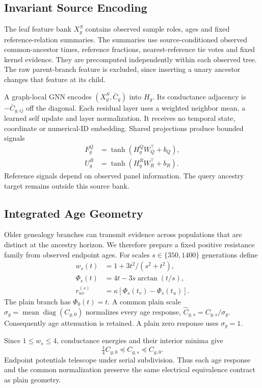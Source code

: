\documentclass[letterpaper]{article}
\begin{document}
\subsection{Invariant Source Encoding}
The leaf feature bank $X_g^S$ contains observed sample roles, ages and fixed reference-relation summaries. The summaries use source-conditioned observed common-ancestor times, reference fractions, nearest-reference tie votes and fixed kernel evidence. They are precomputed independently within each observed tree. The raw parent-branch feature is excluded, since inserting a unary ancestor changes that feature at its child.

A graph-local GNN encodes $(X_g^S,\bar C_g)$ into $H_g$. Its conductance adjacency is $-\bar C_{g,ij}$ off the diagonal. Each residual layer uses a weighted neighbor mean, a learned self update and layer normalization. It receives no temporal state, coordinate or numerical-ID embedding. Shared projections produce bounded signals
\begin{align}
 F_g^Q&=\tanh(H_g^QW_Q^\top+b_Q),\\
 U_g^R&=\tanh(H_g^RW_R^\top+b_R).
\end{align}
Reference signals depend on observed panel information. The query ancestry target remains outside this source bank.


\subsection{Integrated Age Geometry}
Older genealogy branches can transmit evidence across populations that are distinct at the ancestry horizon. We therefore prepare a fixed positive resistance family from observed endpoint ages. For scales $s\in\{350,1400\}$ generations define
\begin{align}
 w_s(t)&=1+3t^2/(s^2+t^2),\\
 \Phi_s(t)&=4t-3s\arctan(t/s),\\
 r_{uv}^{(s)}&=\kappa[\Phi_s(t_v)-\Phi_s(t_u)].
\end{align}
The plain branch has $\Phi_0(t)=t$. A common plain scale $\sigma_g=\operatorname{mean}\operatorname{diag}(C_{g,0})$ normalizes every age response, $\widehat C_{g,s}=C_{g,s}/\sigma_g$. Consequently age attenuation is retained. A plain zero response uses $\sigma_g=1$.

Since $1\leq w_s\leq4$, conductance energies and their interior minima give
\begin{equation}
 \tfrac14 C_{g,0}\preceq C_{g,s}\preceq C_{g,0}.
\end{equation}
Endpoint potentials telescope under serial subdivision. Thus each age response and the common normalization preserve the same electrical equivalence contract as plain geometry.
\end{document}
